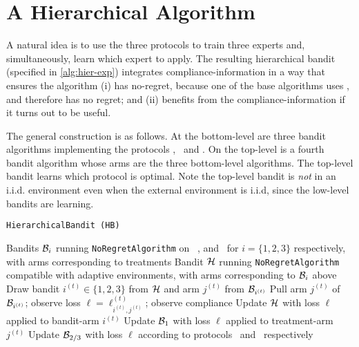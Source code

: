 
\section{A Hierarchical Algorithm}

A natural idea is to use the three protocols to train three experts and, simultaneously, learn which expert to apply. The resulting hierarchical bandit (specified in  \ref{alg:hier-exp}) integrates compliance-information in a way that ensures the algorithm (i) has no-regret, because one of the base algorithms uses \chosen, and therefore has no regret; and (ii) benefits from the compliance-information if it turns out to be useful.

The general construction is as follows. At the bottom-level are three bandit algorithms implementing the protocols \chosen, \actual\, and \comply. On the top-level is a fourth bandit algorithm whose arms are the three bottom-level algorithms. The top-level bandit learns which protocol is optimal. 
Note the top-level bandit is \emph{not} in an i.i.d. environment even when the external environment is i.i.d, since the low-level bandits are learning.
 
\begin{algorithm}
   \caption{\texttt{HierarchicalBandit (HB)}}
   \label{alg:hier-exp}
   \begin{algorithmic}   
   	 Bandits ${\mathcal B}_i$ running \texttt{NoRegretAlgorithm} on \comply\, \chosen, and \actual\, for $i =\{1,2,3\}$ respectively, with arms corresponding to treatments
   	 Bandit ${\mathcal H}$ running \texttt{NoRegretAlgorithm} compatible with adaptive environments, with arms corresponding to ${\mathcal B}_i$ above
	   \STATE Draw bandit $i^{(t)}\in\{1,2,3\}$ from ${\mathcal H}$ and arm $j^{(t)}$ from ${\mathcal B}_{i^{(t)}}$
	   \STATE Pull arm $j^{(t)}$ of ${\mathcal B}_{i^{(t)}}$; observe loss $\ell=\ell_{i^{(t)},j^{(t)}}^{(t)}$; observe compliance
	\STATE Update ${\mathcal H}$ with loss $\ell$ applied to bandit-arm $i^{(t)}$
	\STATE Update ${\mathcal B}_1$ with loss $\ell$ applied to treatment-arm $j^{(t)}$
	\ENDIF
	\STATE Update ${\mathcal B}_{2/3}$ with loss $\ell$ according to protocols \chosen\, and \actual\, respectively
   	\ENDFOR

       	\end{algorithmic}
\end{algorithm}          

